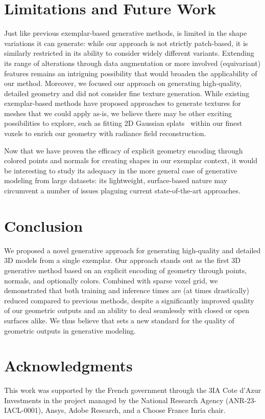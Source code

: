 \section{Limitations and Future Work}
\label{sec:limitations}

Just like previous exemplar-based generative methods, \ourmethod is limited in the shape variations it can generate: while our approach is not strictly patch-based, it is similarly restricted in its ability to consider widely different variants. %
Extending its range of alterations through data augmentation or more involved (equivariant) features remains an intriguing possibility that would broaden the applicability of our method. Moreover, we focused our approach on generating high-quality, detailed geometry and did not consider fine texture generation. While existing exemplar-based methods have proposed approaches to generate textures for meshes that we could apply as-is, we believe there may be other exciting possibilities to explore, such as fitting 2D Gaussian splats~\cite{Huang2DGS2024} within our finest voxels to enrich our geometry with radiance field reconstruction.

Now that we have proven the efficacy of explicit geometry encoding through colored points and normals for creating shapes in our exemplar context, it would be interesting to study its adequacy in the more general case of generative modeling from large datasets: its lightweight, surface-based nature may circumvent a number of issues plaguing current state-of-the-art approaches. 

\section{Conclusion}
\label{sec:conclusion}
We proposed a novel generative approach for generating high-quality and detailed 3D models from a single exemplar. Our approach stands out as the first 3D generative method based on an explicit encoding of geometry through points, normals, and optionally colors. Combined with sparse voxel grid, we demonstrated that both training and inference times are (at times drastically) reduced compared to previous methods, despite a significantly improved quality of our geometric outputs and an ability to deal seamlessly with closed or open surfaces alike. We thus believe that \ourmethod sets a new standard for the quality of geometric outputs in generative modeling. 

\section{Acknowledgments}
This work was supported by the French government through the 3IA Cote d’Azur Investments in the project managed by the National Research Agency (ANR-23-IACL-0001), Ansys, Adobe Research, and a Choose France Inria chair. \vspace*{-2mm}